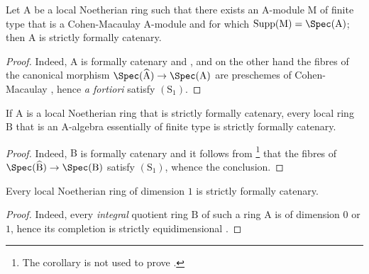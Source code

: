 \begin{corollary}[7.2.7]
\label{IV.7.2.7}
Let $\mathrm{A}$ be a local Noetherian ring such that there exists an $\mathrm{A}$-module $\mathrm{M}$ of finite type that is a Cohen-Macaulay $\mathrm{A}$-module and for which $\operatorname{Supp}(\mathrm{M})=\Spec(\mathrm{A})$; then $\mathrm{A}$ is strictly formally catenary.
\end{corollary}

\begin{proof}
Indeed, $\mathrm{A}$ is formally catenary  and , and on the other hand the fibres of the canonical morphism $\Spec(\widehat{\mathrm{A}})\to\Spec(\mathrm{A})$ are preschemes of Cohen-Macaulay , hence \emph{a fortiori} satisfy $(\mathrm{S}_1)$.
\end{proof}

\begin{corollary}[7.2.8]
\label{IV.7.2.8}
If $\mathrm{A}$ is a local Noetherian ring that is strictly formally catenary, every local ring $\mathrm{B}$ that is an A-algebra essentially of finite type is strictly formally catenary.
\end{corollary}

\begin{proof}
Indeed, $\mathrm{B}$ is formally catenary  and it follows from \footnote{The corollary  is not used to prove .} that the fibres of $\Spec(\widehat{\mathrm{B}})\to\Spec(\mathrm{B})$ satisfy $(\mathrm{S}_1)$, whence the conclusion.
\end{proof}

\begin{corollary}[7.2.9]
\label{IV.7.2.9}
Every local Noetherian ring of dimension $1$ is strictly formally catenary.
\end{corollary}

\begin{proof}
Indeed, every \emph{integral} quotient ring $\mathrm{B}$ of such a ring $\mathrm{A}$ is of dimension $0$ or $1$, hence its completion is strictly equidimensional .
\end{proof}

